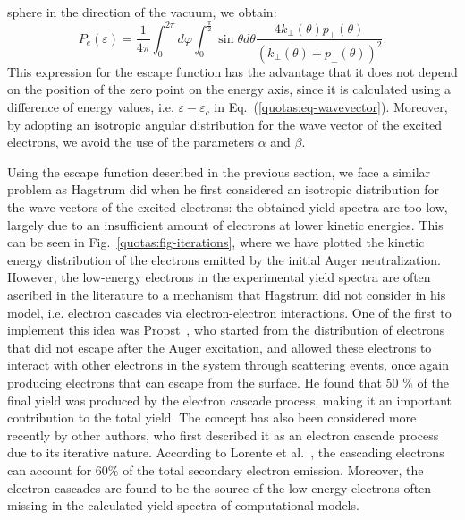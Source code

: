 \begin{refsection}
sphere in the direction of the vacuum, we obtain: 
\begin{equation} 
P_e(\varepsilon) = \frac{1}{4\pi} \int_{0}^{2\pi} d\varphi 
\int_0^{\frac{\pi}{2}} \sin{\theta} d\theta\frac{4k_\perp (\theta) p_\perp 
(\theta)}{(k_\perp (\theta) + p_\perp(\theta))^2}. 
\end{equation} 
This expression for the escape function has the advantage that it does not 
depend on the position of the zero point on the energy axis, since it is 
calculated using a difference of energy values, i.e. $\varepsilon - 
\varepsilon_c$ in Eq.~(\ref{quotas:eq-wavevector}). Moreover, by adopting an 
isotropic angular distribution for the wave vector of the excited electrons, 
we avoid the use of the parameters $\alpha$ and $\beta$. 
 
 
Using the escape function described in the previous section, we face a similar 
problem as Hagstrum did when he first considered an isotropic distribution for 
the wave vectors of the excited electrons: the obtained yield spectra are too 
low, largely due to an insufficient amount of electrons at lower kinetic 
energies. This can be seen in Fig.~\ref{quotas:fig-iterations}, where we have 
plotted the kinetic energy distribution of the electrons emitted by the 
initial Auger neutralization. However, the low-energy electrons in the 
experimental yield spectra are often ascribed in the literature to a mechanism 
that Hagstrum did not consider in his model, i.e. electron cascades via 
electron-electron interactions. One of the first to implement this idea was  
Propst~\cite{Propst1963}, who started from the distribution of electrons that 
did not escape after the Auger excitation, and allowed these electrons to 
interact with other electrons in the system through scattering events, once 
again producing electrons that can escape from the surface. He found that 50 
\% of the final yield was produced by the electron cascade process, making it 
an important contribution to the total yield. The concept has also been 
considered more recently by other authors, who first described it as an 
electron cascade process due to its iterative nature. According to Lorente et 
al.~\cite{Lorente1995}, the cascading electrons can account for 60\% of the 
total secondary electron emission. Moreover, the electron cascades are found 
to be the source of the low energy electrons often missing in the calculated 
yield spectra of computational models.\\ 
 

\end{refsection}
